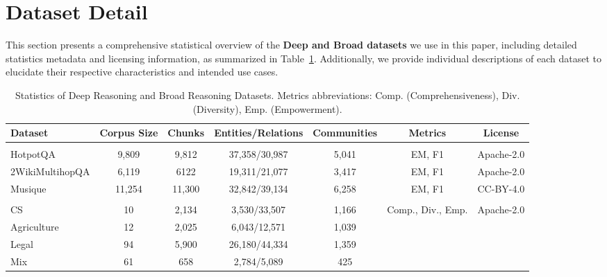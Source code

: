 \section{Dataset Detail}
\label{appendix:dataset_detail}

This section presents a comprehensive statistical overview of the \textbf{Deep and Broad datasets} we use in this paper, including detailed statistics metadata and licensing information, as summarized in Table~\ref{tab:dataset_stats}. Additionally, we provide individual descriptions of each dataset to elucidate their respective characteristics and intended use cases.

\begin{table}[t]
\centering
\caption{Statistics of Deep Reasoning and Broad Reasoning Datasets. Metrics abbreviations: Comp. (Comprehensiveness), Div. (Diversity), Emp. (Empowerment).}
\scriptsize
\begin{tabular}{lcccccc}
\toprule
Dataset & Corpus Size & Chunks & Entities/Relations & Communities & Metrics & License \\
\midrule
\rowcolor{gray!20}
\multicolumn{7}{l}{\textbf{Deep Reasoning Tasks}} \\
HotpotQA & 9,809 & 9,812 & 37,358/30,987 & 5,041 & EM, F1 & Apache-2.0 \\
2WikiMultihopQA & 6,119 & 6122 & 19,311/21,077 & 3,417 & EM, F1 & Apache-2.0 \\
Musique & 11,254 & 11,300 & 32,842/39,134 & 6,258 & EM, F1 & CC-BY-4.0 \\
\midrule
\rowcolor{gray!20}
\multicolumn{7}{l}{\textbf{Broad Reasoning Tasks}} \\
CS & 10 & 2,134 & 3,530/33,507 & 1,166 & \multirow{4}{*}{Comp., Div., Emp.} & \multirow{4}{*}{Apache-2.0} \\
Agriculture & 12 & 2,025 & 6,043/12,571 & 1,039 &  &  \\
Legal & 94 & 5,900 & 26,180/44,334 & 1,359 &  &  \\
Mix & 61 & 658 & 2,784/5,089 & 425 &  &  \\
\bottomrule
\end{tabular}
\label{tab:dataset_stats}
\end{table}

